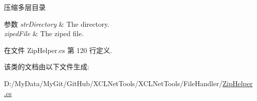 压缩多层目录 


\begin{DoxyParams}{参数}
{\em str\-Directory} & The directory.\\
\hline
{\em ziped\-File} & The ziped file.\\
\hline
\end{DoxyParams}


在文件 Zip\-Helper.\-cs 第 120 行定义.



该类的文档由以下文件生成\-:\begin{DoxyCompactItemize}
\item 
D\-:/\-My\-Data/\-My\-Git/\-Git\-Hub/\-X\-C\-L\-Net\-Tools/\-X\-C\-L\-Net\-Tools/\-File\-Handler/\hyperlink{_zip_helper_8cs}{Zip\-Helper.\-cs}\end{DoxyCompactItemize}
